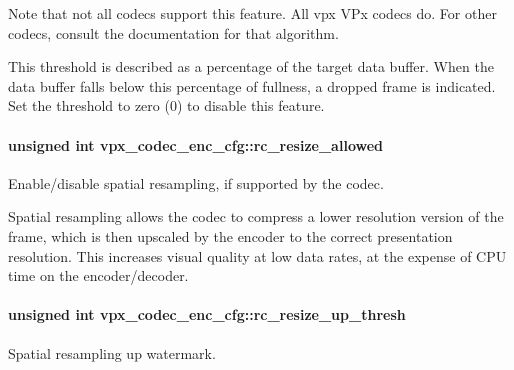 \-Note that not all codecs support this feature. \-All vpx \-V\-Px codecs do. \-For other codecs, consult the documentation for that algorithm.

\-This threshold is described as a percentage of the target data buffer. \-When the data buffer falls below this percentage of fullness, a dropped frame is indicated. \-Set the threshold to zero (0) to disable this feature. \hypertarget{structvpx__codec__enc__cfg_a02a4e2f18fb0fdfff44df8b0d9a99d6c}{
\paragraph[{rc\-\_\-resize\-\_\-allowed}]{\setlength{\rightskip}{0pt plus 5cm}unsigned int {\bf vpx\-\_\-codec\-\_\-enc\-\_\-cfg\-::rc\-\_\-resize\-\_\-allowed}}}\label{structvpx__codec__enc__cfg_a02a4e2f18fb0fdfff44df8b0d9a99d6c}


\-Enable/disable spatial resampling, if supported by the codec. 

\-Spatial resampling allows the codec to compress a lower resolution version of the frame, which is then upscaled by the encoder to the correct presentation resolution. \-This increases visual quality at low data rates, at the expense of \-C\-P\-U time on the encoder/decoder. \hypertarget{structvpx__codec__enc__cfg_a855599c0660f31dfcab4a64996b4f6ad}{
\paragraph[{rc\-\_\-resize\-\_\-up\-\_\-thresh}]{\setlength{\rightskip}{0pt plus 5cm}unsigned int {\bf vpx\-\_\-codec\-\_\-enc\-\_\-cfg\-::rc\-\_\-resize\-\_\-up\-\_\-thresh}}}\label{structvpx__codec__enc__cfg_a855599c0660f31dfcab4a64996b4f6ad}


\-Spatial resampling up watermark. 

